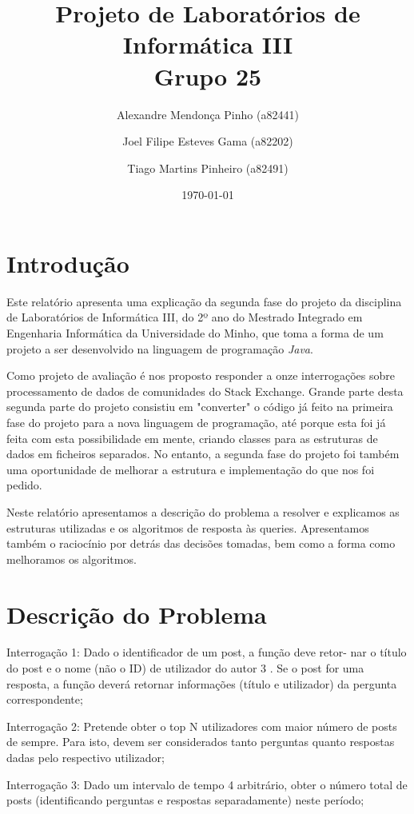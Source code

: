 \documentclass[10pt]{report}
\title{Projeto de Laboratórios de Informática III\\Grupo 25	}
\author{Alexandre Mendonça Pinho (a82441) \and Joel Filipe Esteves Gama (a82202) \and Tiago Martins Pinheiro (a82491)}
\date{\today}
\newcommand\tab[1][0.5cm]{\hspace*{#1}}
\begin{document}
\maketitle

\tableofcontents
\chapter{Introdução}
\label{sec:intro}

\tab Este relatório apresenta uma explicação da segunda fase do projeto da disciplina de Laboratórios de Informática III, do 2º ano do Mestrado Integrado em Engenharia Informática da Universidade do Minho, que toma a forma de um projeto a ser desenvolvido na linguagem de programação \textit{Java}.

Como projeto de avaliação é nos proposto responder a onze interrogações sobre processamento de dados de comunidades do Stack Exchange. Grande parte desta segunda parte do projeto consistiu em "converter" o código já feito na primeira fase do projeto para a nova linguagem de programação, até porque esta foi já feita com esta possibilidade em mente, criando classes para as estruturas de dados em ficheiros separados. No entanto, a segunda fase do projeto foi também uma oportunidade de melhorar a estrutura e implementação do que nos foi pedido.

Neste relatório apresentamos a descrição do problema a resolver e explicamos as estruturas utilizadas e os algoritmos de resposta às queries. Apresentamos também o raciocínio por detrás das decisões tomadas, bem como a forma como melhoramos os algoritmos.

\chapter{Descrição do Problema}
\label{sec:problema}

\tab Interrogação 1: Dado o identificador de um post, a função deve retor-
nar o título do post e o nome (não o ID) de utilizador do autor 3 . Se o post
for uma resposta, a função deverá retornar informações (título e utilizador)
da pergunta correspondente;

 Interrogação 2: Pretende obter o top N utilizadores com maior número
de posts de sempre. Para isto, devem ser considerados tanto perguntas
quanto respostas dadas pelo respectivo utilizador;

 Interrogação 3: Dado um intervalo de tempo 4 arbitrário, obter o número
total de posts (identificando perguntas e respostas separadamente) neste
período;
\end{document}
